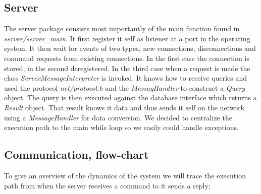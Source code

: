 \documentclass[10pt, a4paper]{article}
\begin{document}
\subsection{Server}
The server package consists most importantly of the main function found in \emph{server/server\_main}. It first register it self as listener at a port in the operating system. It then wait for events of two types, new connections, disconnections and command requests from existing connections. In the first case the connection is stored, in the second deregistered. In the third case when a request is made the class \emph{ServerMessageInterpreter} is invoked. It knows how to receive queries and used the protocol \emph{net/protocol.h} and the \emph{MessagHandler} to construct a \emph{Query} object. The query is then executed against the database interface which returns a \emph{Result} object. That result knows it data and thus sends it self on the network using a \emph{MessageHandler} for data conversion. We decided to centralize the execution path to the main while loop so we easily could handle exceptions.

\subsection{Communication, flow-chart}
To give an overview of the dynamics of the system we will trace the execution path from when the server receives a command to it sends a reply;
\end{document}
